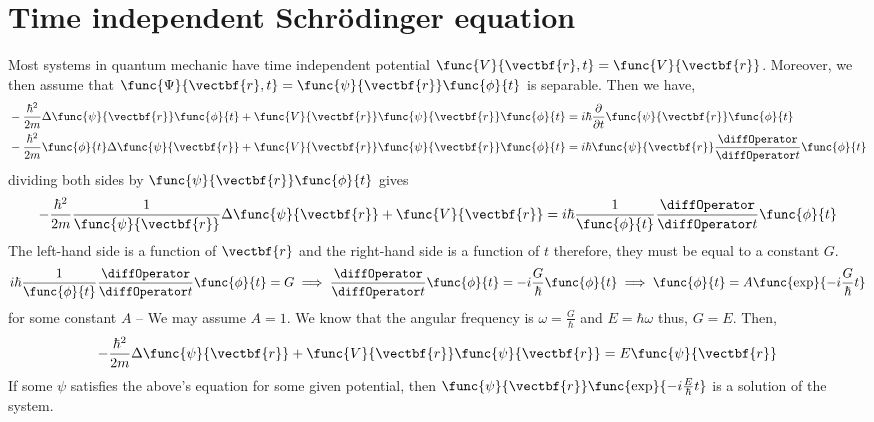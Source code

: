 \section{Time independent Schr\"{o}dinger equation}
Most systems in quantum mechanic have time independent potential \(\func{V}{\vectbf{r}, t} = \func{V}{\vectbf{r}}\). Moreover, we then assume that \(\func{\Psi}{\vectbf{r},t} = \func{\psi}{\vectbf{r}} \func{\phi}{t}\) is separable. Then we have,
\begin{align*}
     & -\frac{\hbar^2}{2m} \Delta \func{\psi}{\vectbf{r}} \func{\phi}{t} + \func{V}{\vectbf{r}} \func{\psi}{\vectbf{r}} \func{\phi}{t}  = i \hbar \dfrac{\partial}{\partial t} \func{\psi}{\vectbf{r}} \func{\phi}{t}           \\
     & -\frac{\hbar^2}{2m} \func{\phi}{t}\Delta \func{\psi}{\vectbf{r}} + \func{V}{\vectbf{r}} \func{\psi}{\vectbf{r}} \func{\phi}{t}  = i \hbar \func{\psi}{\vectbf{r}} \dfrac{\diffOperator}{\diffOperator t}  \func{\phi}{t}
\end{align*}
dividing both sides by \(\func{\psi}{\vectbf{r}} \func{\phi}{t}\) gives
\begin{equation*}
    -\frac{\hbar^2}{2m} \dfrac{1}{\func{\psi}{\vectbf{r}}}\Delta \func{\psi}{\vectbf{r}} + \func{V}{\vectbf{r}}  = i \hbar \frac{1}{\func{\phi}{t}} \dfrac{\diffOperator}{\diffOperator t}  \func{\phi}{t}
\end{equation*}
The left-hand side is a function of \(\vectbf{r}\) and the right-hand side is a function of \(t\) therefore, they must be equal to a constant \(G\).
\begin{equation*}
    i \hbar \frac{1}{\func{\phi}{t}} \dfrac{\diffOperator}{\diffOperator t}  \func{\phi}{t} = G \implies  \dfrac{\diffOperator}{\diffOperator t}  \func{\phi}{t} = -i \frac{G}{\hbar} \func{\phi}{t} \implies \func{\phi}{t} = A \func{\exp}{-i\frac{G}{\hbar} t}
\end{equation*}
for some constant \(A\) -- We may assume \(A = 1\). We know that the angular frequency is \(\omega = \frac{G}{\hbar}\) and \(E = \hbar \omega\) thus, \(G = E\). Then,
\begin{equation*}
    -\frac{\hbar^2}{2m} \Delta \func{\psi}{\vectbf{r}} + \func{V}{\vectbf{r}}\func{\psi}{\vectbf{r}} = E\func{\psi}{\vectbf{r}}
\end{equation*}
If some \(\psi\) satisfies the above's equation for some given potential, then \(\func{\psi}{\vectbf{r}} \func{\exp}{- i \frac{E}{\hbar} t}\) is a solution of the system.
